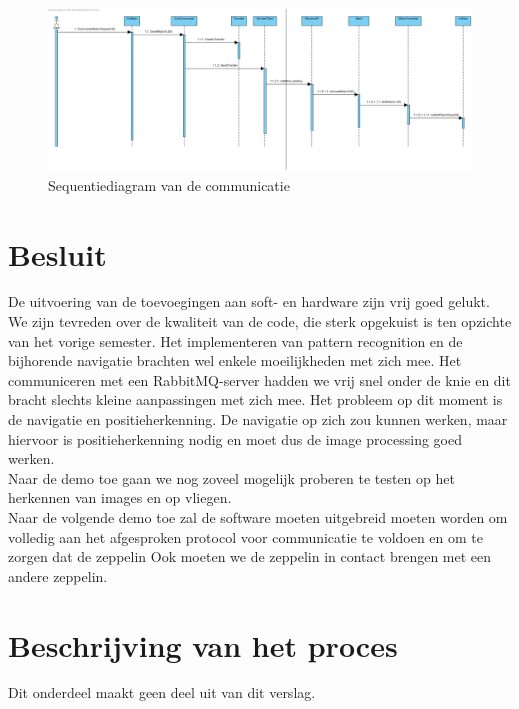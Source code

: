 \documentclass[tt]{penoverslag}
\begin{document}
\begin{figure}[H]
\begin{center}
\includegraphics[width=1\textwidth]{PiToClientCommunication.png}
\end{center}
\caption{Sequentiediagram van de communicatie}
\label{Sequence}
\end{figure}






\section{Besluit}
De uitvoering van de toevoegingen aan soft- en hardware zijn vrij goed gelukt. We zijn tevreden over de kwaliteit van de code, die sterk opgekuist is ten opzichte van het vorige semester. Het implementeren van pattern recognition en de bijhorende navigatie brachten wel enkele moeilijkheden met zich mee. Het communiceren met een RabbitMQ-server hadden we vrij snel onder de knie en dit bracht slechts kleine aanpassingen met zich mee. Het probleem op dit moment is de navigatie en positieherkenning. De navigatie op zich zou kunnen werken, maar hiervoor is positieherkenning nodig en moet dus de image processing goed werken. \\
Naar de demo toe gaan we nog zoveel mogelijk proberen te testen op het herkennen van images en op vliegen. \\
Naar de volgende demo toe zal de software moeten uitgebreid moeten worden om volledig aan het afgesproken protocol voor communicatie te voldoen en om te zorgen dat de zeppelin Ook moeten we de zeppelin in contact brengen met een andere zeppelin. \\

\newpage\makeappendix

\section{Beschrijving van het proces}
Dit onderdeel maakt geen deel uit van dit verslag.
\end{document}
